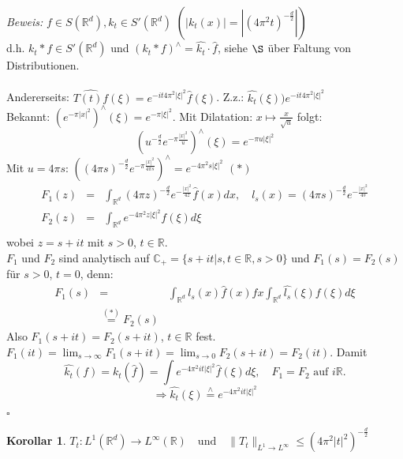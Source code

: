 \documentclass[12pt,a4paper,titlepage]{scrartcl}
\newtheorem{Korollar}[Satz]{Korollar}
\numberwithin{equation}{section}
\newcommand{\C}{\mathbb{C}} %
\newcommand{\R}{\mathbb{R}} %
\newcommand{\Bew}{\emph{Beweis: }}
\newcommand{\qed}{\begin{flushright}
		$\square$
	\end{flushright}}
\begin{document}
	\Bew 
		$f \in S(\R^{d}), k_{t} \in S'(\R^{d})$ $(|k_{t}(x)| = |(4 \pi^{2} t)^{-\frac{d}{2}}|)$ \\
		d.h. $k_{t} \ast f \in S'(\R^{d})$ und $(k_{t} \ast f)^{\wedge} = \hat{k_{t}} \cdot \hat{f}$, siehe $\S$ über Faltung von Distributionen. \\ \\
		Andererseits: $\widehat{T(t)f}(\xi) = e^{-it4\pi^{2}|\xi|^{2}} \hat{f}(\xi)$. Z.z.: $\hat{k_{t}}(\xi) ) e^{-it4\pi^{2}|\xi|^{2}}$ \\
		Bekannt: $\left( e^{-\pi |x|^{2}} \right)^{\wedge}(\xi) = e^{-\pi |\xi|^{2}}$. Mit Dilatation: $x \mapsto \frac{x}{\sqrt{u}}$ folgt:
		\[ \left( u^{-\frac{d}{2}} e^{-\pi\frac{|x|^{2}}{u}} \right)^{\wedge} (\xi) = e^{- \pi u |\xi|^{2}} \]
		Mit $u = 4 \pi s$: $\left( (4 \pi s)^{-\frac{d}{2}} e^{-\pi \frac{|x|^{2}}{4 \pi s}} \right)^{\wedge} = e^{-4 \pi^{2} s |\xi|^{2}}$ $(*)$
		\begin{eqnarray*}
			F_{1}(z) &=& \int_{\R^{d}} (4 \pi z)^{- \frac{d}{2}} e^{- \frac{|x|^{2}}{4z}} \hat{f}(x) dx, \quad l_{s}(x) = (4 \pi s)^{- \frac{d}{2}} e^{- \frac{|x|^{2}}{4s}} \\
			F_{2}(z) &=& \int_{\R^{d}} e^{- 4 \pi^{2} z |\xi|^{2}} f(\xi) d\xi \\
		\end{eqnarray*}
		wobei $z = s + i t$ mit $s > 0$, $t \in \R$. \\
		$F_{1}$ und $F_{2}$ sind analytisch auf $\C_{+} = \{ s + i t | s, t \in \R, s > 0 \}$ und $F_{1}(s) = F_{2}(s)$ für $s > 0$, $t = 0$, denn:
		\begin{eqnarray*}
			F_{1}(s) & = & \int_{\R^{d}} l_{s}(x) \hat{f}(x) fx \int_{\R^{d}} \hat{l_{s}}(\xi) f(\xi) d\xi \\
			& \overset{(*)}{=} F_{2}(s)
		\end{eqnarray*}
		Also $F_{1}(s + it) = F_{2}(s + it)$, $t \in \R$ fest. $F_{1}(it) = \lim_{s \rightarrow \infty} F_{1}(s + it) = \lim_{s \rightarrow 0} F_{2}(s + it) = F_{2}(it)$.
		Damit 
		 	\[ \hat{k_{t}}(f) = k_{t}(\hat{f}) = \int e^{- 4\pi^{2}it|\xi|^{2}} \hat{f}(\xi) d\xi, \quad F_{1} = F_{2} \text{ auf } i\R. \]
			 \[ \Rightarrow \hat{k_{t}}(\xi) \overset{\wedge}{=} e^{-4\pi^{2}it|\xi|^{2}} \]
	\qed


	\begin{Korollar} $T_{t} \colon L^{1}(\R^{d}) \rightarrow L^{\infty}(\R) \quad \text{und} \quad \| T_{t} \|_{L^{1}\rightarrow L^{\infty}} \leq \left( 4 \pi^{2} |t|^{2} \right)^{-\frac{d}{2}}$
	\end{Korollar}
	
\end{document}

